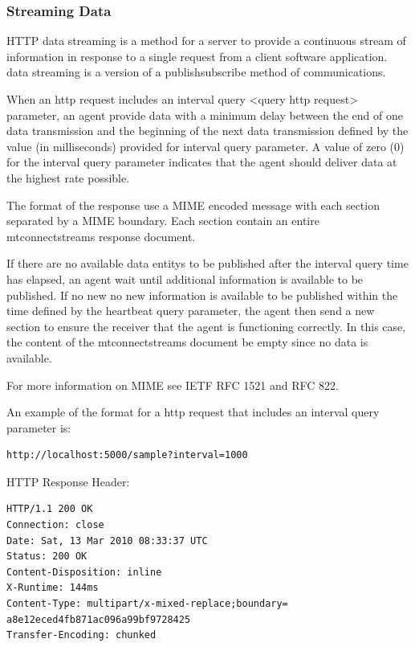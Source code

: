 \documentclass{mtconnect}	%
\begin{document}
\subsubsection{Streaming Data}
\label{sec:Streaming Data}

HTTP \gls{data streaming} is a method for a server to provide a continuous stream of information in response to a single \gls{request} from a client software application.  \gls{data streaming} is a version of a \gls{publishsubscribe} method of communications.

When an \gls{http request} includes an \gls{interval query} <\gls{query http request}> parameter, an \gls{agent} \MUST provide data with a minimum delay between the end of one data transmission and the beginning of the next data transmission defined by the value (in milliseconds) provided for \gls{interval query} parameter.  A value of zero (0) for the \gls{interval query} parameter indicates that the \gls{agent} should deliver data at the highest rate possible.

The format of the response \MUST use a MIME encoded message with each section separated by a MIME boundary.  Each section \MUST contain an entire \gls{mtconnectstreams response document}. 

If there are no available \glspl{data entity} to be published after the \gls{interval query} time has elapsed, an \gls{agent} \MUST wait until additional information is available to be published.  If no new no new information is available to be published within the time defined by the \gls{heartbeat query} parameter, the \gls{agent} \MUST then send a new section to ensure the receiver that the \gls{agent} is functioning correctly.  In this case, the content of the \gls{mtconnectstreams} document \MUST be empty since no data is available.

For more information on MIME see IETF RFC 1521 and RFC 822.  

An example of the format for a \gls{http request} that  includes an \gls{interval query} parameter is:
\begin{lstlisting}[firstnumber=1,escapechar=|,%
    caption={Example for HTTP Request with interval parameter},label={lst:example-for-http-request-with-interval-parameter}]
http://localhost:5000/sample?interval=1000
\end{lstlisting}

HTTP Response Header:
\begin{lstlisting}[firstnumber=1,escapechar=|,%
    caption={HTTP Response header},label={lst:http-response-header}]
HTTP/1.1 200 OK
Connection: close
Date: Sat, 13 Mar 2010 08:33:37 UTC
Status: 200 OK
Content-Disposition: inline
X-Runtime: 144ms
Content-Type: multipart/x-mixed-replace;boundary=
a8e12eced4fb871ac096a99bf9728425
Transfer-Encoding: chunked
\end{lstlisting}
\end{document}
